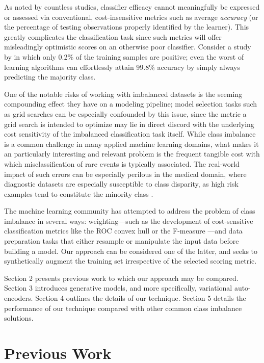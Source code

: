 \documentclass[twoside,11pt]{article}
\begin{document}
As noted by countless studies, classifier efficacy cannot meaningfully be expressed or assessed via conventional, cost-insensitive metrics such as average \emph{accuracy} (or the percentage of testing observations properly identified by the learner). This greatly complicates the classification task since such metrics will offer misleadingly optimistic scores on an otherwise poor classifier. Consider a study by \cite{lewis1994heterogeneous} in which only 0.2\% of the training samples are positive; even the worst of learning algorithms can effortlessly attain 99.8\% accuracy by simply always predicting the majority class.

One of the notable risks of working with imbalanced datasets is the seeming compounding effect they have on a modeling pipeline; model selection tasks such as grid searches can be especially confounded by this issue, since the metric a grid search is intended to optimize may lie in direct discord with the underlying cost sensitivity of the imbalanced classification task itself. While class imbalance is a common challenge in many applied machine learning domains, what makes it an particularly interesting and relevant problem is the frequent tangible cost with which misclassification of rare events is typically associated. The real-world impact of such errors can be especially perilous in the medical domain, where diagnostic datasets are especially susceptible to class disparity, as high risk examples tend to constitute the minority class \citep{rahman2013addressing}.

The machine learning community has attempted to address the problem of class imbalance in several ways: weighting---such as the development of cost-sensitive classification metrics like the ROC convex hull \citep{provost2001robust} or the F-measure \citep{lewis1994training}---and data preparation tasks that either resample or manipulate the input data before building a model. Our approach can be considered one of the latter, and seeks to synthetically augment the training set irrespective of the selected scoring metric.

Section 2 presents previous work to which our approach may be compared. Section 3 introduces generative models, and more specifically, variational auto-encoders. Section 4 outlines the details of our technique. Section 5 details the performance of our technique compared with other common class imbalance solutions. \\

\section{Previous Work}
\end{document}
